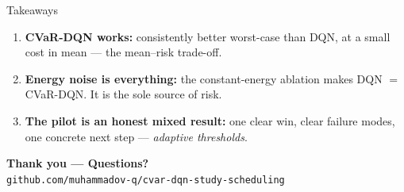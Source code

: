\documentclass[aspectratio=169,11pt]{beamer}
\newcommand{\hl}[1]{{\color{accent}\textbf{#1}}}
\begin{document}
\begin{frame}{Takeaways}
  \begin{enumerate}
    \item \hl{CVaR-DQN works:} consistently better worst-case than DQN,
          at a small cost in mean --- the mean--risk trade-off.
    \item \hl{Energy noise is everything:} the constant-energy ablation
          makes DQN $=$ CVaR-DQN. It is the sole source of risk.
    \item \hl{The pilot is an honest mixed result:} one clear win, clear
          failure modes, one concrete next step --- \emph{adaptive thresholds}.
  \end{enumerate}
  \vfill
  \begin{center}
    {\Large\color{accent}\textbf{Thank you --- Questions?}}\\[0.4em]
    {\footnotesize\texttt{github.com/muhammadov-q/cvar-dqn-study-scheduling}}
  \end{center}
\end{frame}
\end{document}
